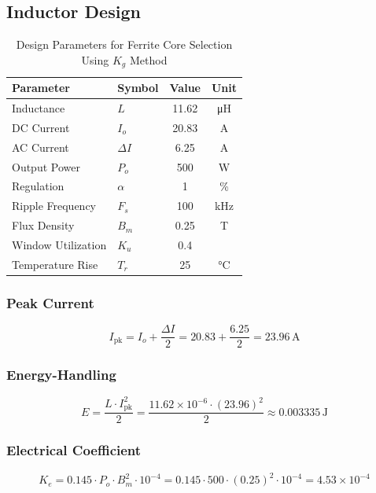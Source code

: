 \subsection{Inductor Design}
\begin{table}[h]
\centering
\caption{Design Parameters for Ferrite Core Selection Using \( K_g \) Method}
\label{tab:core_parameters}
\begin{tabular}{llSS}
\toprule
\textbf{Parameter} & \textbf{Symbol} & \textbf{Value} & \textbf{Unit} \\
\midrule
Inductance & \( L \) & 11.62 & \si{\micro\henry} \\
DC Current & \( I_o \) & 20.83 & \si{\ampere} \\
AC Current & \( \Delta I \) & 6.25 & \si{\ampere} \\
Output Power & \( P_o \) & 500 & \si{\watt} \\
Regulation & \( \alpha \) & 1 & \% \\
Ripple Frequency & \( F_s \) & 100 & \si{\kilo\hertz} \\
Flux Density & \( B_m \) & 0.25 & \si{\tesla} \\
Window Utilization & \( K_u \) & 0.4 &  \\
Temperature Rise & \( T_r \) & 25 & \si{\degreeCelsius} \\
\bottomrule
\end{tabular}
\end{table}
\subsubsection*{Peak Current}
\begin{equation}
I_{\text{pk}} = I_o + \frac{\Delta I}{2} 
= 20.83 + \frac{6.25}{2}
= \boxed{23.96\,\text{A}}
\end{equation}

\subsubsection*{Energy-Handling}
\begin{equation}
    E = \frac{L \cdot I_{\text{pk}}^2}{2} 
= \frac{11.62 \times 10^{-6} \cdot (23.96)^2}{2} \nonumber 
\approx \boxed{0.003335\,\text{J}}
\end{equation}

\subsubsection*{Electrical Coefficient}
\begin{equation}
 K_e = 0.145 \cdot P_o \cdot B_m^2 \cdot 10^{-4} 
= 0.145 \cdot 500 \cdot (0.25)^2 \cdot 10^{-4} 
= \boxed{4.53 \times 10^{-4}}   
\end{equation}

